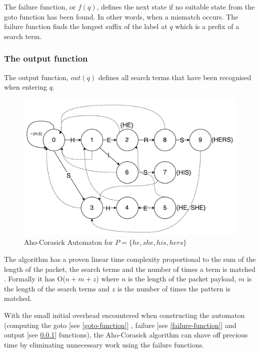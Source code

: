\documentclass{article}
\begin{document}
The failure function, or \(f(q)\), defines the next state if no suitable state from the goto function has been found. In other words, when a mismatch occurs. The failure function finds the longest suffix of the label at \(q\) which is a prefix of a search term.

\subsubsection{The output function} \label{output-function}

The output function, \(out(q)\) defines all search terms that have been recognised when entering \(q\).

\begin{figure}[h!bt]
  \label{trie}
  \centering
  \makeatletter
  \includegraphics[width=\textwidth]{images/ac-automaton}
  \caption{Aho-Corasick Automaton for \(P = \{he, she, his, hers\}\)}
\end{figure}

The algorithm has a proven linear time complexity proportional to the sum of the length of the packet, the search terms and the number of times a term is matched \citep{Aho1975}. Formally it has O(\(n + m + z\)) where \(n\) is the length of the packet payload, \(m\) is the length of the search terms and \(z\) is the number of times the pattern is matched.

With the small initial overhead encountered when constructing the automaton (computing the goto [see \ref{goto-function}] , failure [see \ref{failure-function}] and output [see \ref{output-function}] functions), the Aho-Corasick algorithm can shave off precious time by eliminating unnecessary work using the failure functions.
\end{document}
